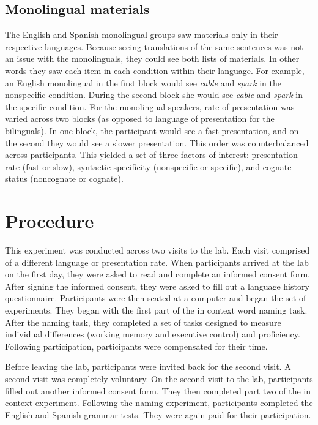 \subsection{Monolingual materials}
The English and Spanish monolingual groups saw materials only in their respective languages. Because seeing translations of the same sentences was not an issue with the monolinguals, they could see both  lists of materials. In other words they saw each item in each condition within their language. For example, an English monolingual in the first block  would see \textit{cable} and \textit{spark} in the nonspecific condition. During the second block she would see \textit{cable} and \textit{spark} in the specific condition.  
   For the monolingual speakers, rate of presentation was varied across two blocks (as opposed to language of presentation for the bilinguals). In one block, the participant would see a fast presentation, and on the second they would see a slower presentation. This order was counterbalanced across participants. This yielded a set of three factors of interest: presentation rate (fast or slow), syntactic specificity (nonspecific or specific), and cognate status (noncognate or cognate).

\section{Procedure}
This experiment was conducted across two visits to the lab. Each visit comprised of a different language or presentation rate.  When participants arrived at the lab on the first day, they were asked to read and complete an informed consent form. After signing the informed consent, they were asked to fill out a language history questionnaire. Participants were then seated at a computer and began the set of experiments. They began with the first part of the in context word naming task. After the naming task, they completed  a set of tasks designed to measure individual differences (working memory and executive control) and proficiency. Following participation, participants were compensated for their time. 

Before leaving the lab, participants were invited back for the second visit. A second visit was  completely voluntary. On the second visit to the lab, participants filled out another informed consent form. They then completed part two of the in context experiment. Following the naming experiment, participants completed the English and Spanish grammar tests. They were again paid for their participation.


